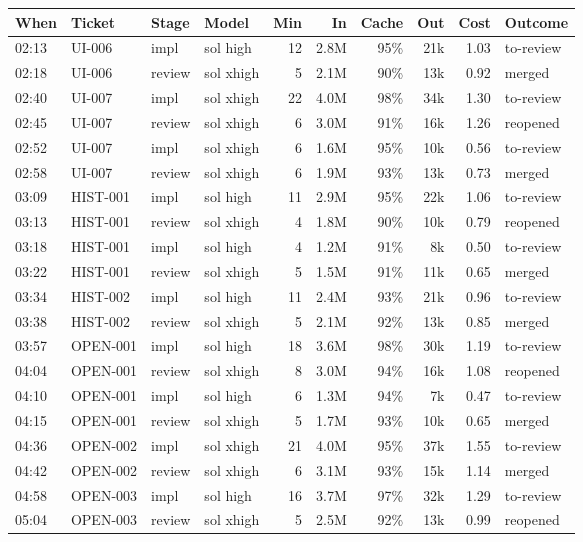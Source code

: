 \documentclass[11pt,a4paper]{article}
\begin{document}
{\small
\begin{tabularx}{\linewidth}{@{}llllrrrrrX@{}}
\toprule
When & Ticket & Stage & Model & Min & In & Cache & Out & Cost & Outcome \\
\midrule
02:13 & UI-006 & impl & sol high & 12 & 2.8M & 95\% & 21k & 1.03 & to-review \\
02:18 & UI-006 & review & sol xhigh & 5 & 2.1M & 90\% & 13k & 0.92 & merged \\
02:40 & UI-007 & impl & sol xhigh & 22 & 4.0M & 98\% & 34k & 1.30 & to-review \\
02:45 & UI-007 & review & sol xhigh & 6 & 3.0M & 91\% & 16k & 1.26 & reopened \\
02:52 & UI-007 & impl & sol xhigh & 6 & 1.6M & 95\% & 10k & 0.56 & to-review \\
02:58 & UI-007 & review & sol xhigh & 6 & 1.9M & 93\% & 13k & 0.73 & merged \\
03:09 & HIST-001 & impl & sol high & 11 & 2.9M & 95\% & 22k & 1.06 & to-review \\
03:13 & HIST-001 & review & sol xhigh & 4 & 1.8M & 90\% & 10k & 0.79 & reopened \\
03:18 & HIST-001 & impl & sol high & 4 & 1.2M & 91\% & 8k & 0.50 & to-review \\
03:22 & HIST-001 & review & sol xhigh & 5 & 1.5M & 91\% & 11k & 0.65 & merged \\
03:34 & HIST-002 & impl & sol high & 11 & 2.4M & 93\% & 21k & 0.96 & to-review \\
03:38 & HIST-002 & review & sol xhigh & 5 & 2.1M & 92\% & 13k & 0.85 & merged \\
03:57 & OPEN-001 & impl & sol high & 18 & 3.6M & 98\% & 30k & 1.19 & to-review \\
04:04 & OPEN-001 & review & sol xhigh & 8 & 3.0M & 94\% & 16k & 1.08 & reopened \\
04:10 & OPEN-001 & impl & sol high & 6 & 1.3M & 94\% & 7k & 0.47 & to-review \\
04:15 & OPEN-001 & review & sol xhigh & 5 & 1.7M & 93\% & 10k & 0.65 & merged \\
04:36 & OPEN-002 & impl & sol xhigh & 21 & 4.0M & 95\% & 37k & 1.55 & to-review \\
04:42 & OPEN-002 & review & sol xhigh & 6 & 3.1M & 93\% & 15k & 1.14 & merged \\
04:58 & OPEN-003 & impl & sol high & 16 & 3.7M & 97\% & 32k & 1.29 & to-review \\
05:04 & OPEN-003 & review & sol xhigh & 5 & 2.5M & 92\% & 13k & 0.99 & reopened \\

\end{tabularx}}
\end{document}
